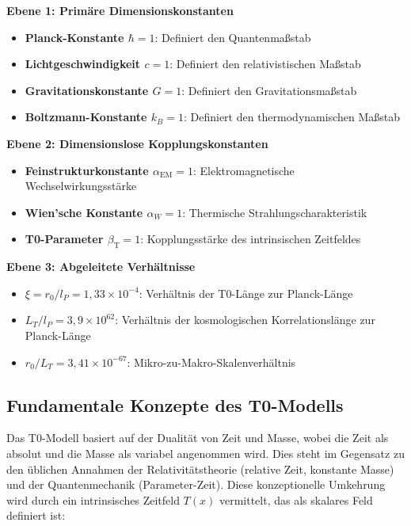\documentclass[12pt,a4paper]{article}
\newcommand{\Tfield}{T(x)}
\newcommand{\alphaEM}{\alpha_{\text{EM}}}
\newcommand{\betaT}{\beta_{\text{T}}}
\begin{document}
	\begin{tcolorbox}[colback=blue!5!white,colframe=blue!75!black,title=Hierarchische Ebenen der Konstanten]
		\textbf{Ebene 1: Primäre Dimensionskonstanten}
		\begin{itemize}
			\item \textbf{Planck-Konstante $\hbar = 1$}: Definiert den Quantenmaßstab
			\item \textbf{Lichtgeschwindigkeit $c = 1$}: Definiert den relativistischen Maßstab
			\item \textbf{Gravitationskonstante $G = 1$}: Definiert den Gravitationsmaßstab
			\item \textbf{Boltzmann-Konstante $k_B = 1$}: Definiert den thermodynamischen Maßstab
		\end{itemize}
		
		\textbf{Ebene 2: Dimensionslose Kopplungskonstanten}
		\begin{itemize}
			\item \textbf{Feinstrukturkonstante $\alphaEM = 1$}: Elektromagnetische Wechselwirkungsstärke
			\item \textbf{Wien'sche Konstante $\alpha_W = 1$}: Thermische Strahlungscharakteristik
			\item \textbf{T0-Parameter $\betaT = 1$}: Kopplungsstärke des intrinsischen Zeitfeldes
		\end{itemize}
		
		\textbf{Ebene 3: Abgeleitete Verhältnisse}
		\begin{itemize}
			\item \textbf{$\xi = r_0/l_P = 1,33 \times 10^{-4}$}: Verhältnis der T0-Länge zur Planck-Länge
			\item \textbf{$L_T/l_P = 3,9 \times 10^{62}$}: Verhältnis der kosmologischen Korrelationslänge zur Planck-Länge
			\item \textbf{$r_0/L_T = 3,41 \times 10^{-67}$}: Mikro-zu-Makro-Skalenverhältnis
		\end{itemize}
	\end{tcolorbox}
	
	\subsection{Fundamentale Konzepte des T0-Modells}
	
	Das T0-Modell basiert auf der Dualität von Zeit und Masse, wobei die Zeit als absolut und die Masse als variabel angenommen wird. Dies steht im Gegensatz zu den üblichen Annahmen der Relativitätstheorie (relative Zeit, konstante Masse) und der Quantenmechanik (Parameter-Zeit). Diese konzeptionelle Umkehrung wird durch ein intrinsisches Zeitfeld $\Tfield$ vermittelt, das als skalares Feld definiert ist:
	
\end{document}
